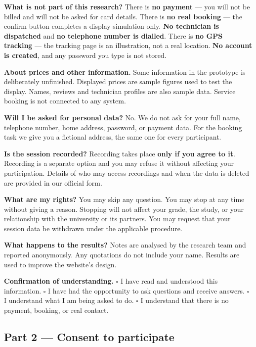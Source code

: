 \documentclass[]{interact}
\theoremstyle{plain}
\begin{document}
\textbf{What is not part of this research?} There is \textbf{no payment} --- you will not be billed and
will not be asked for card details. There is \textbf{no real booking} --- the confirm button completes
a display simulation only. \textbf{No technician is dispatched} and \textbf{no telephone number is
dialled}. There is \textbf{no GPS tracking} --- the tracking page is an illustration, not a real
location. \textbf{No account is created}, and any password you type is not stored.

\textbf{About prices and other information.} Some information in the prototype is deliberately
unfinished. Displayed prices are sample figures used to test the display. Names, reviews and technician
profiles are also sample data. Service booking is not connected to any system.

\textbf{Will I be asked for personal data?} No. We do not ask for your full name, telephone number,
home address, password, or payment data. For the booking task we give you a fictional address, the
same one for every participant.

\textbf{Is the session recorded?} Recording takes place \textbf{only if you agree to it}. Recording is a
separate option and you may refuse it without affecting your participation. Details of who may access
recordings and when the data is deleted are provided in our official form.

\textbf{What are my rights?} You may skip any question. You may stop at any time without giving a
reason. Stopping will not affect your grade, the study, or your relationship with the university or its
partners. You may request that your session data be withdrawn under the applicable procedure.

\textbf{What happens to the results?} Notes are analysed by the research team and reported anonymously.
Any quotations do not include your name. Results are used to improve the website's design.

\textbf{Confirmation of understanding.} $\square$ I have read and understood this information.
$\square$ I have had the opportunity to ask questions and receive answers. $\square$ I understand what I
am being asked to do. $\square$ I understand that there is no payment, booking, or real contact.

\subsection*{Part 2 --- Consent to participate}
\end{document}
